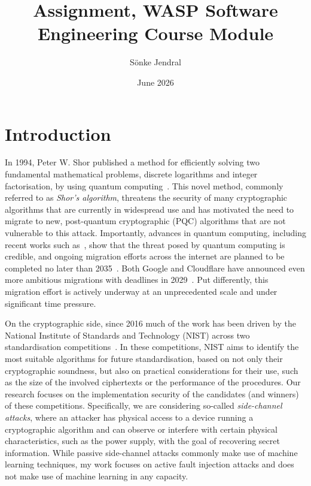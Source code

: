 \documentclass{article}
\title{Assignment, WASP Software Engineering Course Module}
\author{Sönke Jendral}
\date{June 2026}
\begin{document}
\maketitle

\section{Introduction}

In 1994, Peter W. Shor published a method for efficiently solving two fundamental mathematical problems, discrete logarithms and integer factorisation, by using quantum computing~\cite{shor1994algorithms}. This novel method, commonly referred to as \emph{Shor's algorithm}, threatens the security of many cryptographic algorithms that are currently in widespread use and has motivated the need to migrate to new, post-quantum cryptographic (PQC) algorithms that are not vulnerable to this attack.
Importantly, advances in quantum computing, including recent works such as~\cite{babbush2026securingellipticcurvecryptocurrencies,cain2026shorsalgorithmpossible10000}, show that the threat posed by quantum computing is credible, and ongoing migration efforts across the internet are planned to be completed no later than 2035~\cite{nistir8547}. Both Google and Cloudflare have announced even more ambitious migrations with deadlines in 2029~\cite{googlemigration,cloudflaremigration}. Put differently, this migration effort is actively underway at an unprecedented scale and under significant time pressure.

On the cryptographic side, since 2016 much of the work has been driven by the National Institute of Standards and Technology (NIST) across two standardisation competitions~\cite{nistpqccomp}. In these competitions, NIST aims to identify the most suitable algorithms for future standardisation, based on not only their cryptographic soundness, but also on practical considerations for their use, such as the size of the involved ciphertexts or the performance of the procedures. Our research focuses on the implementation security of the candidates (and winners) of these competitions. Specifically, we are considering so-called \emph{side-channel attacks}, where an attacker has physical access to a device running a cryptographic algorithm and can observe or interfere with certain physical characteristics, such as the power supply, with the goal of recovering secret information. While passive side-channel attacks commonly make use of machine learning techniques, my work focuses on active fault injection attacks and does not make use of machine learning in any capacity.
\end{document}
